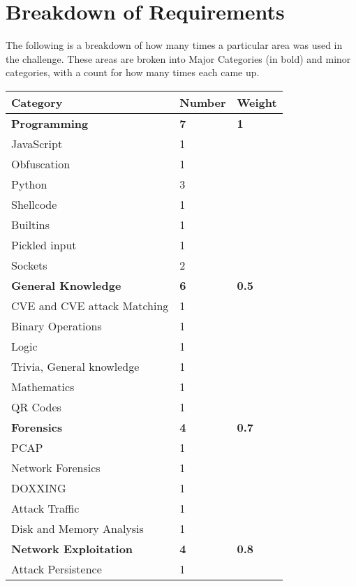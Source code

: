 \documentclass[a4paper,11pt]{report}
\begin{document}
	\section{Breakdown of Requirements}
	 	The following is a breakdown of how many times a particular area was used in the challenge. 
		These areas are broken into Major Categories (in bold) and minor categories, with a count for how many times each came up. 
		\begin{table}[htb]
			\centering
			\begin{tabular}{| l | l | l |}
				\hline
				\textbf{Category} & \textbf{Number} & \textbf{Weight} \\ \hline 
				\textbf{Programming} & \textbf{7} & \textbf{1} \\ \hline
				\quad JavaScript & 1 & \\ \hline 
				\quad Obfuscation & 1 & \\ \hline
				\quad Python & 3 & \\ \hline 
				\qquad Shellcode & 1 & \\ \hline 
				\qquad Builtins & 1 & \\ \hline 
				\qquad Pickled input & 1 & \\ \hline 
				\quad Sockets & 2 & \\ \hline 
				\textbf{General Knowledge} & \textbf{6} & \textbf{0.5}\\ \hline 
				\quad CVE and CVE attack Matching & 1 & \\ \hline 
				\quad Binary Operations & 1 & \\ \hline 
				\quad Logic & 1 & \\ \hline 
				\quad Trivia, General knowledge & 1 & \\ \hline 
				\quad Mathematics & 1 & \\ \hline 
				\quad QR Codes & 1 & \\ \hline 
				\textbf{Forensics} & \textbf{4} & \textbf{0.7}\\ \hline
				\quad PCAP & 1 & \\ \hline
				\quad Network Forensics & 1 & \\ \hline 
				\quad DOXXING & 1 & \\ \hline 
				\quad Attack Traffic & 1 & \\ \hline 
				\quad Disk and Memory Analysis & 1 & \\ \hline 
				\textbf{Network Exploitation} & \textbf{4} & \textbf{0.8} \\ \hline 
				\quad Attack Persistence & 1 & \\ \hline 

\end{tabular}
\end{table}
\end{document}
